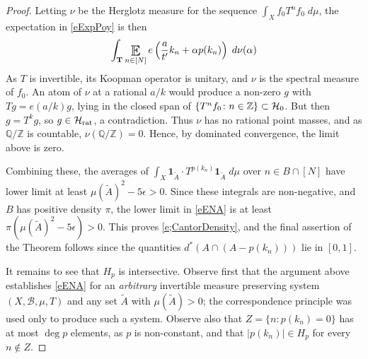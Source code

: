 \begin{proof}
Letting $ \nu   $ be the Herglotz measure for the sequence $\int_X f_0 T^n f_0\;d\mu$, the expectation in \eqref{eExpPoy} is then 
\begin{equation}
   \int_{\mathbf{T}}\Expectation _{\substack{ n\in  [N] \\  }}  e\left(\frac{a}{t'} k_n  + \alpha p(k_n) \right)  \;d \nu (\alpha)  
\end{equation}
As $T$ is invertible, its Koopman operator is unitary, and $\nu$ is the spectral measure of $f_0$. 
An atom of $\nu$ at a rational $a/k$ would produce a non-zero $g$ with $Tg=e(a/k)g$, lying in the closed span of $\{T^nf_0\colon n\in \mathbb{Z}\}\subset \mathcal H_{\textup{0}}$. 
But then $g=T^kg$, so $g\in \mathcal H_{\textup{rat}}$, a contradiction. 
Thus $\nu$ has no rational point masses, and as $\mathbb{Q}/\mathbb{Z}$ is countable, $\nu(\mathbb{Q}/\mathbb{Z})=0$. 
Hence, by dominated convergence, the limit above is zero.  

Combining these, the averages of $\int_X \mathbf{1}_{\tilde A}\cdot T^{p(k_n)}\mathbf{1}_{\tilde A}\;d\mu$ over $n\in B\cap[N]$ have lower limit at least $\mu(\tilde A)^2-5\epsilon>0$. 
Since these integrals are non-negative, and $B$ has positive density $\pi$, the lower limit in \eqref{eENA} is at least $\pi(\mu(\tilde A)^2-5\epsilon)>0$. 
This proves \eqref{e;CantorDensity}, and the final assertion of the Theorem follows since the quantities $d^\ast(A\cap (A-p(k_n)))$ lie in $[0,1]$. 

It remains to see that $H_p$ is intersective. 
Observe first that the argument above establishes \eqref{eENA} for an \emph{arbitrary} invertible measure preserving system $(X,\mathcal B,\mu ,T)$ and any set $\tilde A$ with $\mu (\tilde A)>0$; 
the correspondence principle was used only to produce such a system. 
Observe also that $Z=\{n\colon p(k_n)=0\}$ has at most $\deg p$ elements, as $p$ is non-constant, and that $\lvert p(k_n)\rvert \in H_p$ for every $n\notin Z$. 


\end{proof}
